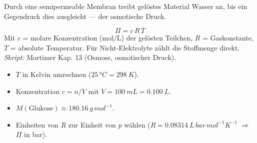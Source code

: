 

Durch eine semipermeable Membran treibt gelöstes Material Wasser
an, bis ein Gegendruck dies ausgleicht --- der osmotische Druck.

\begin{werkzeugkasten}
\[
  \Pi = c\,R\,T
\]
Mit $c$ = molare Konzentration (mol/L) der gelösten Teilchen, $R$ =
Gaskonstante, $T$ = absolute Temperatur. Für Nicht-Elektrolyte zählt die
Stoffmenge direkt.
\textit{Skript:} Mortimer Kap. 13 (Osmose, osmotischer Druck).
\end{werkzeugkasten}

\begin{achtung}
\begin{itemize}
  \item $T$ in Kelvin umrechnen ($25\,°C = 298\ K$).
  \item Konzentration $c = n/V$ mit $V = 100\ mL = 0.100\ L$.
  \item $M(\text{Glukose}) \approx 180.16\ g\,mol^{-1}$.
  \item Einheiten von $R$ zur Einheit von $p$ wählen
        ($R = 0.08314\ L\,bar\,mol^{-1}K^{-1}$ $\Rightarrow$ $\Pi$ in bar).
\end{itemize}
\end{achtung}
